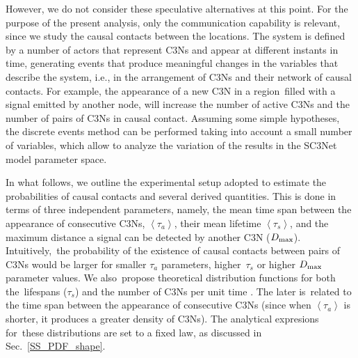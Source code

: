 \documentclass[crop]{CSLB}
\newcommand{\ceti}{C3N}
\newcommand{\cetis}{C3Ns}
\begin{document}
%
However, we do not consider these speculative alternatives at this point.
%
For the purpose of the present analysis, only the communication capability is
relevant, since we study the causal contacts between the locations.
%
The system is defined by a number of actors that represent \cetis{} and appear
at different instants in time, generating events that produce meaningful
changes in the variables that describe the system, i.e., in the arrangement of
\cetis{} and their network of causal contacts.
%
For example, the appearance of a new \ceti{} in a region filled with a signal
emitted by another node, will increase the number of active \cetis{} and the
number of pairs of \cetis{} in causal contact.
%
Assuming some simple hypotheses, the discrete events method can be performed
taking into account a small number of variables, which allow to analyze the
variation of the results in the SC3Net model parameter space.


In what follows, we outline the experimental setup adopted to estimate the
probabilities of causal contacts and several derived quantities.
%
This is done in terms of three independent parameters, namely, the mean time
span between the appearance of consecutive \cetis{}, $\left<\tau_a\right>$,
their mean lifetime $\left<\tau_s\right>$, and the maximum distance a signal
can be detected by another \ceti{} ($D_{\rm max}$).
%
Intuitively, the probability of the existence of causal contacts between pairs
of \cetis{} would be larger for smaller $\tau_a$ parameters, higher $\tau_s$ or
higher $D_{\rm max}$ parameter values.
%
We also propose theoretical distribution functions for both the lifespans
($\tau_s$) and the number of \cetis{} per unit time
\citep{maccone_evolution_2014, Sotos_biotechnology_2019}.
%
The later is related to the time span between the appearance of consecutive
\cetis{} (since when $\left<\tau_a\right>$ is shorter, it produces a greater
density of \cetis{}).
%
The analytical expresions for these distributions are set to a fixed law, as
discussed in Sec.~\ref{SS_PDF_shape}.  
    
     
\end{document}
